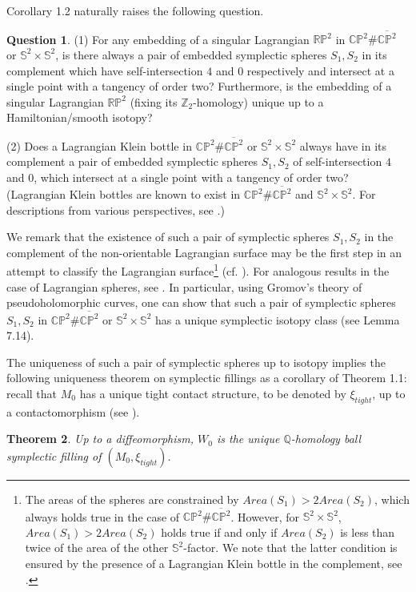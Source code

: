 \documentclass[11pt]{amsart}
\theoremstyle{plain}
\newtheorem{theorem}{Theorem}
\numberwithin{theorem}{section}
\theoremstyle{definition}
\newtheorem{question}[theorem]{Question}
\newcommand{\C}{{\mathbb C}}
\newcommand{\R}{{\mathbb R}}
\newcommand{\Z}{{\mathbb Z}}
\newcommand{\Q}{{\mathbb Q}}
\renewcommand{\P}{{\mathbb P}}
\newcommand{\s}{{\mathbb S}}
\begin{document}
Corollary 1.2 naturally raises the following question. 

\begin{question}
(1) For any embedding of a singular Lagrangian $\R\P^2$ in $\C\P^2\# \overline{\C\P^2}$ or 
$\s^2\times \s^2$, is there always a pair of embedded symplectic spheres $S_1,S_2$ in its complement which have self-intersection $4$ and $0$ respectively and intersect at a single point with a tangency of order two? Furthermore, is the embedding of a singular Lagrangian $\R\P^2$ (fixing its $\Z_2$-homology) unique up to a 
Hamiltonian/smooth isotopy? 

(2) Does a Lagrangian Klein bottle in $\C\P^2\# \overline{\C\P^2}$ or $\s^2\times \s^2$ always have in its complement a pair of embedded symplectic spheres $S_1,S_2$ of self-intersection $4$ and $0$, which intersect at a single point with a tangency of order two? (Lagrangian Klein bottles 
are known to exist in $\C\P^2\# \overline{\C\P^2}$ and $\s^2\times \s^2$. For descriptions from various perspectives, see \cite{CU, BHL, M, Mik, Nem0, Sym}.)
\end{question}

We remark that the existence of such a pair of symplectic spheres $S_1,S_2$ in the complement of the non-orientable Lagrangian surface may be the first step in an attempt to classify the Lagrangian surface\footnote{The areas of the spheres are constrained by $Area(S_1)>2 Area(S_2)$, which always holds true in the case of $\C\P^2\# \overline{\C\P^2}$. However, for $\s^2\times \s^2$, $Area(S_1)>2 Area(S_2)$ holds true if and only if $Area(S_2)$ is less than twice of the area of the other $\s^2$-factor. We note that the latter condition is ensured by the presence of a Lagrangian Klein bottle in the complement, see \cite{AE}.} (cf. \cite{C3}). For analogous results in the case of Lagrangian spheres, see \cite{Hind, Evans, LW}. In particular, using Gromov's theory of pseudoholomorphic curves, one can show that such a pair of symplectic spheres $S_1,S_2$ in $\C\P^2\# \overline{\C\P^2}$ or $\s^2\times \s^2$ has a unique symplectic isotopy class (see Lemma 7.14). 

The uniqueness of such a pair of symplectic spheres up to isotopy implies the following uniqueness theorem on symplectic fillings as a corollary of Theorem 1.1: recall that $M_0$ has a unique tight contact structure, to be denoted by $\xi_{tight}$,  up to a contactomorphism (see \cite{GLS}). 

\begin{theorem}
Up to a diffeomorphism, $W_0$ is the unique $\Q$-homology ball symplectic filling of $(M_0,\xi_{tight})$.
\end{theorem} 
\end{document}
